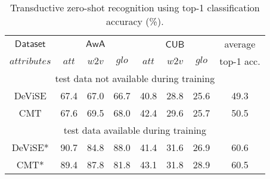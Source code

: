 {{\begin{table}[t!]
\centering
\caption{\footnotesize Transductive zero-shot recognition using top-1 classification accuracy (\%). }
\vspace{1mm}
\scalebox{0.72}
{
\begin{tabular}{|c||lll||lll||c|}
\hline
$\mathsf{Dataset}$ & \multicolumn{3}{c||}{$\mathsf{AwA}$}                                                      & \multicolumn{3}{c||}{$\mathsf{CUB}$}                                                     & average                          \\
                    $\textit{attributes}$    & \multicolumn{1}{c}{$\textit{att}$} & \multicolumn{1}{c}{$\textit{w2v}$} & \multicolumn{1}{c||}{$\textit{glo}$} & \multicolumn{1}{c}{$\textit{att}$} & \multicolumn{1}{c}{$\textit{w2v}$} & \multicolumn{1}{c||}{$\textit{glo}$} & top-1 acc. \\ \hline\hline
\multicolumn{8}{|c|}{test data not available during training}                                                                                                                                                                                     \\ \hline \hline
DeViSE \cite{frome2013devise}                  &           67.4               &           67.0             &        66.7                  &            40.8             &          28.8               &              25.6            &        49.3                         \\
CMT \cite{socher2013zero}                    &               67.6           &             69.5            &           68.0               &               42.4          &             29.6            &            25.7              &        50.5                         \\ \hline \hline
\multicolumn{8}{|c|}{test data available during training}                                                                                                                                                                                        \\ \hline \hline
DeViSE* \cite{frome2013devise}                &            90.7              &           84.8            &        88.0                  &           41.4              &            31.6             &              26.9            &       60.6                          \\
CMT* \cite{socher2013zero}                   &              89.4            &              87.8           &             81.8             &               43.1          &             31.8          &              28.9            &         60.5                       \\

\end{tabular}}
\end{table}}}
